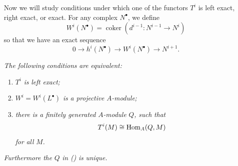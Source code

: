 {\medskip
Now we will study conditions under which one of the functors $T^i$ is left exact, right exact, or exact. For any complex $N^\bullet$, we define
\[
 W^i(N^\bullet)=\operatorname{coker}(d^{i-1}\colon N^{i-1}\to N^i)
\]
so that we have an exact sequence
\[
 0\to h^i(N^\bullet)\to W^i(N^\bullet)\to N^{i+1}.
\]

 \emph{The following conditions are equivalent:}
\begin{enumerate}[label=(\roman*),leftmargin=2.5em,itemsep=0pt,topsep=1pt,parsep=0pt]
\item\hypertarget{result-III-12.4i}{} \emph{$T^i$ is left exact;}
\item\hypertarget{result-III-12.4ii}{} \emph{$W^i=W^i(L^\bullet)$ is a projective $A$-module;}
\item\hypertarget{result-III-12.4iii}{} \emph{there is a finitely generated $A$-module $Q$, such that}
\[
 T^i(M)\cong\operatorname{Hom}_A(Q,M)
\]
\emph{for all $M$.}
\end{enumerate}
\emph{Furthermore the $Q$ in () is unique.}
}
